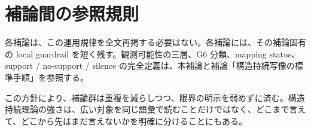 \documentclass[12pt,a4paper]{article}
\begin{document}
\section{補論間の参照規則}\label{ux88dcux8ad6ux9593ux306eux53c2ux7167ux898fux5247}

各補論は、この運用規律を全文再掲する必要はない。各補論には、その補論固有の local guardrail を短く残す。観測可能性の三層、G6 分類、mapping status、support / no-support / silence の完全定義は、本補論と補論「構造持続写像の標準手順」を参照する。

この方針により、補論群は重複を減らしつつ、限界の明示を弱めずに済む。構造持続理論の強さは、広い対象を同じ語彙で読むことだけではなく、どこまで言えて、どこから先はまだ言えないかを明確に分けることにもある。
\end{document}
